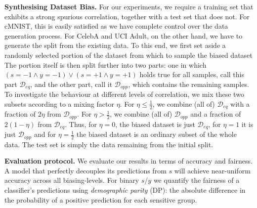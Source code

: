 \textbf{Synthesising Dataset Bias.}
\noindent For our experiments, we require a training set that exhibits a strong spurious correlation, together with a test set that does not.
For cMNIST, this is easily satisfied as we have complete control over the data generation process.
For CelebA and  UCI Adult, on the other hand,
we have to generate the split from the existing data.
To this end, we first set aside a randomly selected portion of the dataset from which to sample the biased dataset
The portion itself is then split further into two parts:
one in which $(s=-1 \land y=-1) \lor (s=+1 \land y=+1)$ holds true for all samples, call this part $\mathcal{D}_{eq}$,
and the other part, call it $\mathcal{D}_{opp}$, which contains the remaining samples.
To investigate the behaviour at different levels of correlation,
we mix these two subsets according to a mixing factor $\eta$.
For $\eta \leq \tfrac{1}{2}$, we combine (all of) $\mathcal{D}_{eq}$
with a fraction of $2\eta$ from $\mathcal{D}_{opp}$.
For $\eta > \tfrac{1}{2}$, we combine (all of) $\mathcal{D}_{opp}$
and a fraction of $2(1 -\eta)$ from $\mathcal{D}_{eq}$.
Thus, for $\eta=0$, the biased dataset is just $\mathcal{D}_{eq}$,
for $\eta=1$ it is just $\mathcal{D}_{opp}$
and for $\eta=\tfrac{1}{2}$ the biased dataset is an ordinary subset of the whole data. The test set is simply the data remaining from the initial split.

\textbf{Evaluation protocol.}
We evaluate our results in terms of accuracy and fairness.
A model that perfectly decouples its predictions from $s$ will achieve near-uniform accuracy across all biasing-levels.
For binary $s$/$y$ we quantify the fairness of a classifier's predictions using \emph{demographic parity} (DP): the  absolute difference in the probability  of a positive prediction for each sensitive group.

